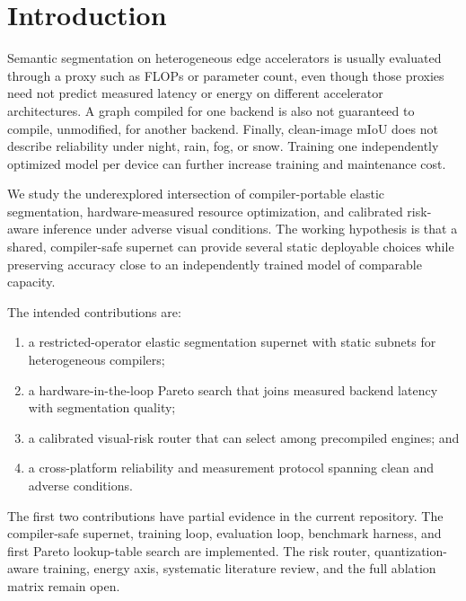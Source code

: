 \section{Introduction}
\label{sec:introduction}

Semantic segmentation on heterogeneous edge accelerators is usually evaluated through a proxy such as FLOPs or parameter count, even though those proxies need not predict measured latency or energy on different accelerator architectures. A graph compiled for one backend is also not guaranteed to compile, unmodified, for another backend. Finally, clean-image mIoU does not describe reliability under night, rain, fog, or snow. Training one independently optimized model per device can further increase training and maintenance cost.

We study the underexplored intersection of compiler-portable elastic segmentation, hardware-measured resource optimization, and calibrated risk-aware inference under adverse visual conditions. The working hypothesis is that a shared, compiler-safe supernet can provide several static deployable choices while preserving accuracy close to an independently trained model of comparable capacity.

The intended contributions are:
\begin{enumerate}
  \item a restricted-operator elastic segmentation supernet with static subnets for heterogeneous compilers;
  \item a hardware-in-the-loop Pareto search that joins measured backend latency with segmentation quality;
  \item a calibrated visual-risk router that can select among precompiled engines; and
  \item a cross-platform reliability and measurement protocol spanning clean and adverse conditions.
\end{enumerate}

The first two contributions have partial evidence in the current repository. The compiler-safe supernet, training loop, evaluation loop, benchmark harness, and first Pareto lookup-table search are implemented. The risk router, quantization-aware training, energy axis, systematic literature review, and the full ablation matrix remain open.

